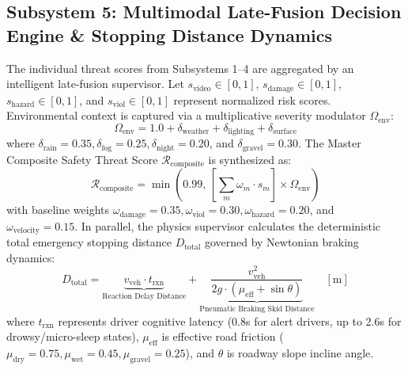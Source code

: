 \documentclass[journal,compsoc]{IEEEtran}
\begin{document}
\subsection{Subsystem 5: Multimodal Late-Fusion Decision Engine \& Stopping Distance Dynamics}
The individual threat scores from Subsystems 1--4 are aggregated by an intelligent late-fusion supervisor. Let $s_{\text{video}} \in [0, 1]$, $s_{\text{damage}} \in [0, 1]$, $s_{\text{hazard}} \in [0, 1]$, and $s_{\text{viol}} \in [0, 1]$ represent normalized risk scores. Environmental context is captured via a multiplicative severity modulator $\Omega_{\text{env}}$:
\begin{equation}
\Omega_{\text{env}} = 1.0 + \delta_{\text{weather}} + \delta_{\text{lighting}} + \delta_{\text{surface}}
\end{equation}
where $\delta_{\text{rain}} = 0.35, \delta_{\text{fog}} = 0.25, \delta_{\text{night}} = 0.20$, and $\delta_{\text{gravel}} = 0.30$. The Master Composite Safety Threat Score $\mathcal{R}_{\text{composite}}$ is synthesized as:
\begin{equation}
\mathcal{R}_{\text{composite}} = \min\left(0.99, \, \left[\sum_{m} \omega_m \cdot s_m\right] \times \Omega_{\text{env}}\right)
\end{equation}
with baseline weights $\omega_{\text{damage}}=0.35, \omega_{\text{viol}}=0.30, \omega_{\text{hazard}}=0.20$, and $\omega_{\text{velocity}}=0.15$. In parallel, the physics supervisor calculates the deterministic total emergency stopping distance $D_{\text{total}}$ governed by Newtonian braking dynamics:
\begin{equation}
D_{\text{total}} = \underbrace{v_{\text{veh}} \cdot t_{\text{rxn}}}_{\text{Reaction Delay Distance}} + \underbrace{\frac{v_{\text{veh}}^2}{2g \cdot (\mu_{\text{eff}} + \sin\theta)}}_{\text{Pneumatic Braking Skid Distance}} \quad [\text{m}]
\end{equation}
where $t_{\text{rxn}}$ represents driver cognitive latency (0.8s for alert drivers, up to 2.6s for drowsy/micro-sleep states), $\mu_{\text{eff}}$ is effective road friction ($\mu_{\text{dry}}=0.75, \mu_{\text{wet}}=0.45, \mu_{\text{gravel}}=0.25$), and $\theta$ is roadway slope incline angle.
\end{document}
